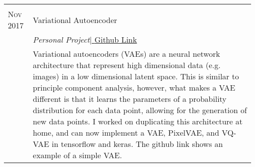 \begin{supertabular}{p{1.8cm}|p{12cm}}
	 \\
	\textsc{Nov 2017} & Variational Autoencoder \\
	& \small\emph{Personal Project}\href{https://github.com/jasonrobwebster/vae-keras-pytorch}{\hfill| \footnotesize{Github Link}}\\
	& \footnotesize{Variational autoencoders (VAEs) are a neural network architecture that represent high dimensional data (e.g. images) in a low dimensional latent space. This is similar to principle component analysis, however, what makes a VAE different is that it learns the parameters of a probability distribution for each data point, allowing for the generation of new data points. I worked on duplicating this architecture at home, and can now implement a VAE, PixelVAE, and VQ-VAE in tensorflow and keras. The github link shows an example of a simple VAE.} \\
\end{supertabular}